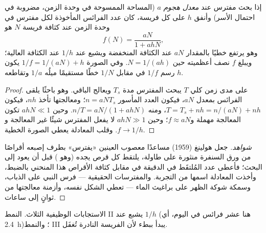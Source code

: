 \begin{theorem}\label{thm:b1:species-interactions:holling}
إذا بحث مفترس عند \emph{معدل هجوم} $a$ (المساحة الممسوحة في
وحدة الزمن، مضروبة في احتمال الأسر) وأنفق 
$h$ على كل فريسة، كان عدد الفرائس المأخوذة لكل مفترس في وحدة
الزمن عند كثافة فريسة $N$ هو
\[
f(N) = \frac{aN}{1 + ahN} ,
\]
وهو يرتفع خطيًا بالمقدار $aN$ عند الكثافة المنخفضة ويشبع عند $1/h$ عند
الكثافة العالية؛ ويبلغ $f$ نصف أعظميته حين $N = 1/(ah)$. وفي الصورة
$1/f = 1/(aN) + h$ يكون رسم $1/f$ في مقابل $1/N$ خطًا مستقيمًا
ميلُه $1/a$ وتقاطعه $h$.
\end{theorem}
\begin{proof}
على مدى زمن كلي $T$ يبحث المفترس مدة $T_s$ ويعالج
الباقي. وهو باحثًا يلقى الفرائس بمعدل $aN$، فيكون العدد
المأسور $n = aN T_s$؛ ومعالجتها تأخذ $nh$، فيكون $T = T_s + nh =
n/(aN) + nh$، ومنه $n/T = aN/(1 + ahN)$. وحين $ahN \ll 1$ تكون المعالجة
مهملة و$f \approx aN$؛ وحين $ahN \gg 1$ لا يفعل المفترس
شيئًا غير المعالجة و$f \to 1/h$. وقلب المعادلة يعطي الصورة الخطية.
\end{proof}
\begin{proof}[شواهد]
جعل هولينغ (1959) مساعدًا معصوب العينين «يفترس» بطرف إصبعه
أقراصًا من ورق السنفرة منثورة على طاولة، يلتقط كل قرص يجده
(وهو ) قبل أن يعود إلى البحث؛ فأعطى عدد المُلتقَط في
الدقيقة في مقابل كثافة الأقراص هذا المنحني بالضبط، وأخذت المعادلة
اسمها من التجربة. والمفترسات الحقيقية --- فرس النبي على الذباب،
وسمكة شوكة الظهر على براغيث الماء --- تعطي الشكل نفسه، وأزمنة
معالجتها من ثوانٍ إلى ساعات.
\end{proof}

\begin{omfigure}

{\small الاستجابات الوظيفية الثلاث. النمط II يشبع عند $1/h$
(هنا عشر فرائس في اليوم، أي  \qty{2.4}{h})؛ والنمط III
يبدأ ببطء لأن الفريسة النادرة تُغفَل.}
\end{omfigure}

